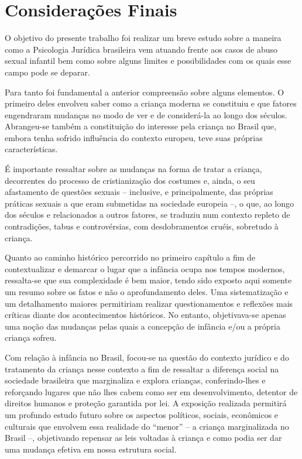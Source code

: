 
\chapter*[Considerações Finais]{Considerações Finais}

O objetivo do presente trabalho foi realizar um breve estudo sobre a maneira como a Psicologia Jurídica brasileira vem atuando frente aos casos de abuso sexual infantil bem como sobre alguns limites e possibilidades com os quais esse campo pode se deparar.

Para tanto foi fundamental a anterior compreensão sobre alguns elementos. O primeiro deles envolveu saber como a criança moderna se constituiu e que fatores engendraram mudanças no modo de ver e de considerá-la ao longo dos séculos. Abrangeu-se também a constituição do interesse pela criança no Brasil que, embora tenha sofrido influência do contexto europeu, teve suas próprias características. 

É importante ressaltar sobre as mudanças na forma de tratar a criança, decorrentes do processo de cristianização dos costumes e, ainda, o seu afastamento de questões sexuais -- inclusive, e principalmente, das próprias práticas sexuais a que eram submetidas na sociedade europeia --, o que, ao longo dos séculos e relacionados a outros fatores, se traduziu num contexto repleto de contradições, tabus e controvérsias, com desdobramentos cruéis, sobretudo à criança.

Quanto ao caminho histórico percorrido no primeiro capítulo a fim de contextualizar e demarcar o lugar que a infância ocupa nos tempos modernos, ressalta-se que sua complexidade é bem maior, tendo sido exposto aqui somente um resumo sobre os fatos e não o aprofundamento deles. Uma sistematização e um detalhamento maiores permitiriam realizar questionamentos e reflexões mais críticas diante dos acontecimentos históricos. No entanto, objetivava-se apenas uma noção das mudanças pelas quais a concepção de infância e/ou a própria criança sofreu.

Com relação à infância no Brasil, focou-se na questão do contexto jurídico e do tratamento da criança nesse contexto a fim de ressaltar a diferença social na sociedade brasileira que marginaliza e explora crianças, conferindo-lhes e reforçando lugares que não lhes cabem como ser em desenvolvimento, detentor de direitos humanos e proteção garantida por lei. A exposição realizada permitirá um profundo estudo futuro sobre os aspectos políticos, sociais, econômicos e culturais que envolvem essa realidade do “menor” -- a criança marginalizada no Brasil --, objetivando repensar as leis voltadas à criança e como podia ser dar uma mudança efetiva em nossa estrutura social.

